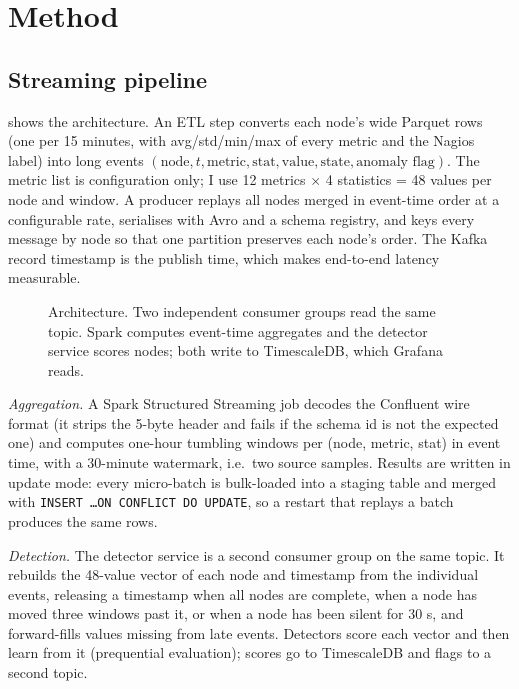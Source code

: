 \section{Method}
\label{sec:method}

\subsection{Streaming pipeline}
 shows the architecture. An ETL step converts each node's wide Parquet rows (one per 15 minutes, with avg/std/min/max of every metric and the Nagios label) into long events $(\text{node}, t, \text{metric}, \text{stat}, \text{value}, \text{state}, \text{anomaly flag})$. The metric list is configuration only; I use 12 metrics $\times$ 4 statistics = 48 values per node and window. A producer replays all nodes merged in event-time order at a configurable rate, serialises with Avro and a schema registry, and keys every message by node so that one partition preserves each node's order. The Kafka record timestamp is the publish time, which makes end-to-end latency measurable.

\begin{figure}[t]
\centering

\caption{Architecture. Two independent consumer groups read the same topic. Spark computes event-time aggregates and the detector service scores nodes; both write to TimescaleDB, which Grafana reads.}
\label{fig:arch}
\end{figure}

\emph{Aggregation.} A Spark Structured Streaming job decodes the Confluent wire format (it strips the 5-byte header and fails if the schema id is not the expected one) and computes one-hour tumbling windows per (node, metric, stat) in event time, with a 30-minute watermark, i.e.\ two source samples. Results are written in update mode: every micro-batch is bulk-loaded into a staging table and merged with \texttt{INSERT \dots ON CONFLICT DO UPDATE}, so a restart that replays a batch produces the same rows.

\emph{Detection.} The detector service is a second consumer group on the same topic. It rebuilds the 48-value vector of each node and timestamp from the individual events, releasing a timestamp when all nodes are complete, when a node has moved three windows past it, or when a node has been silent for 30 s, and forward-fills values missing from late events. Detectors score each vector and then learn from it (prequential evaluation); scores go to TimescaleDB and flags to a second topic.

